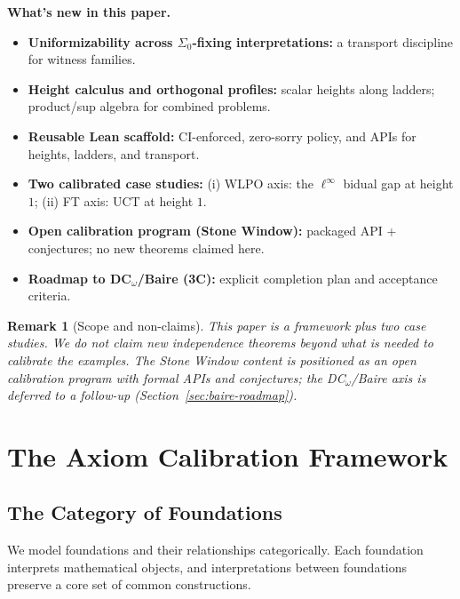\documentclass[11pt]{article}
\newtheorem{remark}[theorem]{Remark}
\newcommand{\linf}{\ell^\infty}
\begin{document}
\begin{mdframed}[style=callout]
\textbf{What's new in this paper.} 
\begin{itemize}
\item \textbf{Uniformizability across $\Sigma_0$-fixing interpretations:} a transport discipline for witness families.
\item \textbf{Height calculus and orthogonal profiles:} scalar heights along ladders; product/sup algebra for combined problems.
\item \textbf{Reusable Lean scaffold:} CI-enforced, zero-sorry policy, and APIs for heights, ladders, and transport.
\item \textbf{Two calibrated case studies:} (i) WLPO axis: the $\linf$ bidual gap at height $1$; (ii) FT axis: UCT at height $1$.
\item \textbf{Open calibration program (Stone Window):} packaged API + conjectures; no new theorems claimed here.
\item \textbf{Roadmap to DC$_\omega$/Baire (3C):} explicit completion plan and acceptance criteria.
\end{itemize}
\end{mdframed}

\begin{remark}[Scope and non-claims]
This paper is a \emph{framework plus two case studies}. We do not claim new independence theorems beyond what is needed to calibrate the examples. The Stone Window content is positioned as an \emph{open calibration program} with formal APIs and conjectures; the DC$_\omega$/Baire axis is deferred to a follow-up (Section~\ref{sec:baire-roadmap}).
\end{remark}

\section{The Axiom Calibration Framework}

\subsection{The Category of Foundations}

We model foundations and their relationships categorically. Each foundation interprets mathematical objects, and interpretations between foundations preserve a core set of common constructions.
\end{document}
